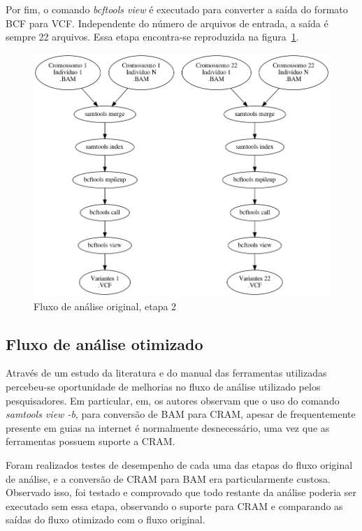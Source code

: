 \documentclass[cic,tc]{iiufrgs}
\begin{document}
Por fim, o comando \textit{bcftools view} é executado para converter a saída do
formato BCF para VCF. Independente do número de arquivos de entrada, a saída é
sempre 22 arquivos. Essa etapa encontra-se reproduzida na
figura~\ref{fig:stage2_orig}.

\begin{figure}
  \caption{Fluxo de análise original, etapa 2}
    \begin{center}
      \includegraphics[width=0.85\linewidth]{img/stage2_orig.png}
    \end{center}
    \label{fig:stage2_orig}
\end{figure}

\subsection{Fluxo de análise otimizado}

Através de um estudo da literatura e do manual das ferramentas utilizadas
percebeu-se oportunidade de melhorias no fluxo de análise utilizado pelos
pesquisadores. Em particular, em,\cite{danecek2021twelve} os autores observam
que o uso do comando \textit{samtools view -b}, para conversão de BAM para
CRAM, apesar de frequentemente presente em guias na internet é normalmente
desnecessário, uma vez que as ferramentas possuem suporte a CRAM.

Foram realizados testes de desempenho de cada uma das etapas do fluxo original
de análise, e a conversão de CRAM para BAM era particularmente custosa.
Observado isso, foi testado e comprovado que todo restante da análise poderia
ser executado sem essa etapa, observando o suporte para CRAM e comparando as
saídas do fluxo otimizado com o fluxo original.
\end{document}
